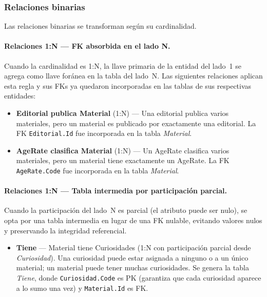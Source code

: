 \documentclass[12pt,a4paper]{article}
\begin{document}
\subsubsection{Relaciones binarias}

Las relaciones binarias se transforman según su cardinalidad.

\paragraph{Relaciones 1:N — FK absorbida en el lado N.}

Cuando la cardinalidad es 1:N, la llave primaria de la entidad del lado~1
se agrega como llave foránea en la tabla del lado~N.
Las siguientes relaciones aplican esta regla y sus FKs ya quedaron
incorporadas en las tablas de sus respectivas entidades:

\begin{itemize}

    \item \textbf{Editorial publica Material} (1:N) — Una editorial publica varios
    materiales, pero un material es publicado por exactamente una editorial.
    La FK \texttt{Editorial.Id} fue incorporada en la tabla \textit{Material}.

    \item \textbf{AgeRate clasifica Material} (1:N) — Un AgeRate clasifica varios
    materiales, pero un material tiene exactamente un AgeRate.
    La FK \texttt{AgeRate.Code} fue incorporada en la tabla \textit{Material}.

\end{itemize}

\paragraph{Relaciones 1:N — Tabla intermedia por participación parcial.}

Cuando la participación del lado~N es parcial (el atributo puede ser nulo),
se opta por una tabla intermedia en lugar de una FK nulable, evitando
valores nulos y preservando la integridad referencial.

\begin{itemize}

    \item \textbf{Tiene} — Material tiene Curiosidades (1:N con participación
    parcial desde \textit{Curiosidad}). Una curiosidad puede estar asignada
    a ninguno o a un único material; un material puede tener muchas curiosidades.
    Se genera la tabla \textit{Tiene}, donde \texttt{Curiosidad.Code}
    es PK (garantiza que cada curiosidad aparece a lo sumo una vez) y
    \texttt{Material.Id} es FK.
\end{itemize}
\end{document}
